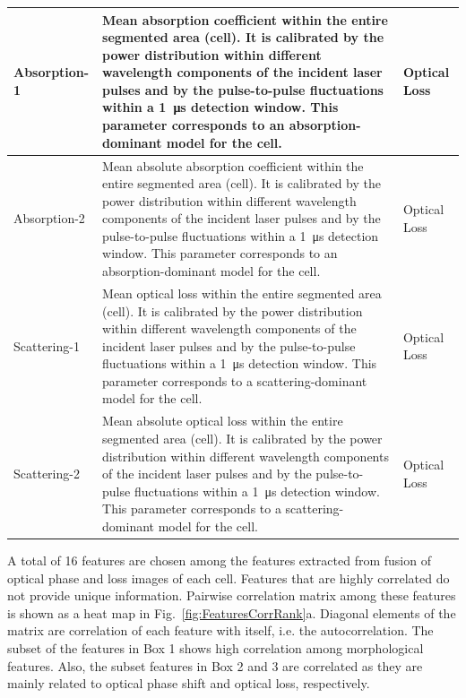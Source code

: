 \documentclass[aps,pra,reprint,longbibliography,superscriptaddress]{revtex4-1}
\begin{document}
\begin{table}[hb!]
\begin{tabular}{|p{}|p{}|p{}|}
Absorption-1	 &Mean absorption coefficient within the entire segmented area (cell). It is calibrated by the power distribution within different wavelength components of the incident laser pulses and by the pulse-to-pulse fluctuations within a \SI{1}{\micro\second} detection window. This parameter corresponds to an absorption-dominant model for the cell.	 &Optical Loss\\ \hline
Absorption-2	 &Mean absolute absorption coefficient within the entire segmented area (cell). It is calibrated by the power distribution within different wavelength components of the incident laser pulses and by the pulse-to-pulse fluctuations within a \SI{1}{\micro\second} detection window. This parameter corresponds to an absorption-dominant model for the cell.	 &Optical Loss\\ \hline
Scattering-1	 &Mean optical loss within the entire segmented area (cell). It is calibrated by the power distribution within different wavelength components of the incident laser pulses and by the pulse-to-pulse fluctuations within a \SI{1}{\micro\second} detection window. This parameter corresponds to a scattering-dominant model for the cell.	 &Optical Loss\\ \hline
Scattering-2	 &Mean absolute optical loss within the entire segmented area (cell). It is calibrated by the power distribution within different wavelength components of the incident laser pulses and by the pulse-to-pulse fluctuations within a \SI{1}{\micro\second} detection window. This parameter corresponds to a scattering-dominant model for the cell.	 &Optical Loss\\
\hline
\end{tabular}
\end{table}

A total of 16 features are chosen among the features extracted from fusion of optical phase and loss images of each cell. Features that are highly correlated do not provide unique information. Pairwise correlation matrix among these features is shown as a heat map in Fig.~\ref{fig:FeaturesCorrRank}a. Diagonal elements of the matrix are correlation of each feature with itself, i.e. the autocorrelation. The subset of the features in Box 1 shows high correlation among morphological features. Also, the subset features in Box 2 and 3 are correlated as they are mainly related to optical phase shift and optical loss, respectively. 
\end{document}

